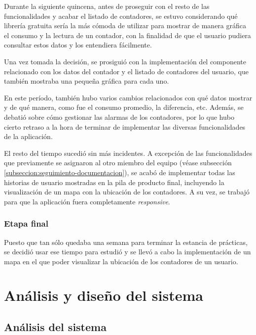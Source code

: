 \documentclass[pdftex,11pt,a4paper]{book}
\begin{document}
Durante la siguiente quincena, antes de proseguir con el resto de las funcionalidades y acabar el listado de contadores, se estuvo considerando qué librería gratuita sería la más cómoda de utilizar para mostrar de manera gráfica el consumo y la lectura de un contador, con la finalidad de que el usuario pudiera consultar estos datos y los entendiera fácilmente. 

Una vez tomada la decisión, se prosiguió con la implementación del componente relacionado con los datos del contador y el listado de contadores del usuario, que también mostraba una pequeña gráfica para cada uno.

En este período, también hubo varios cambios relacionados con qué datos mostrar y de qué manera, como fue el consumo promedio, la diferencia, etc. Además, se debatió sobre cómo gestionar las alarmas de los contadores, por lo que hubo cierto retraso a la hora de terminar de implementar las diversas funcionalidades de la aplicación. 

El resto del tiempo sucedió sin más incidentes. A excepción de las funcionalidades que previamente se asignaron al otro miembro del equipo (véase subsección \ref{subseccion:seguimiento-documentacion}), se acabó de implementar todas las historias de usuario mostradas en la pila de producto final, incluyendo la visualización de un mapa con la ubicación de los contadores. A su vez, se trabajó para que la aplicación fuera completamente \textit{responsive}.

\subsection{Etapa final}

Puesto que tan sólo quedaba una semana para terminar la estancia de prácticas, se decidió usar ese tiempo para estudió y se llevó a cabo la implementación de un mapa en el que poder visualizar la ubicación de los contadores de un usuario.



\chapter{Análisis y diseño del sistema} \label{capitulo:analisis-disenyo}

\section{Análisis del sistema}
\end{document}
